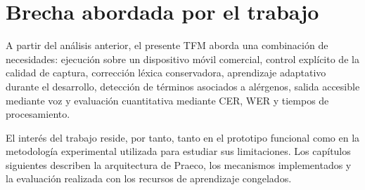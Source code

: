 \section{Brecha abordada por el trabajo}

A partir del análisis anterior, el presente TFM aborda una combinación de necesidades: ejecución sobre un dispositivo móvil comercial, control explícito de la calidad de captura, corrección léxica conservadora, aprendizaje adaptativo durante el desarrollo, detección de términos asociados a alérgenos, salida accesible mediante voz y evaluación cuantitativa mediante CER, WER y tiempos de procesamiento.

El interés del trabajo reside, por tanto, tanto en el prototipo funcional como en la metodología experimental utilizada para estudiar sus limitaciones. Los capítulos siguientes describen la arquitectura de Praeco, los mecanismos implementados y la evaluación realizada con los recursos de aprendizaje congelados.
